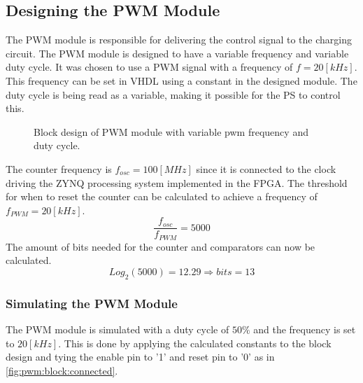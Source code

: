 \documentclass[../report.tex]{subfiles}
\begin{document}
\subsection{Designing the PWM Module} \label{sec:pwm:module}
The PWM module is responsible for delivering the control signal to the charging circuit. The PWM module is designed to have a variable frequency and variable duty cycle. It was chosen to use a PWM signal with a frequency of $ f = 20[kHz]$. This frequency can be set in VHDL using a constant in the designed module. The duty cycle is being read as a variable, making it possible for the PS to control this.

\begin{figure}[H]
    \centering
    \noindent{}
    \caption{Block design of PWM module with variable pwm frequency and duty cycle.}
    \label{fig:pwm:block}
\end{figure}

The counter frequency is $f_{osc} = 100 [MHz]$ since it is connected to the clock driving the ZYNQ processing system implemented in the FPGA. The threshold for when to reset the counter can be calculated to achieve a frequency of $f_{PWM} = 20 [kHz]$.
\begin{equation}
    \frac{f_{osc}}{f_{PWM}} = 5000
\end{equation}
The amount of bits needed for the counter and comparators can now be calculated.
\begin{equation}
    Log_2(5000) = 12.29 \Rightarrow bits = 13
\end{equation}

\subsubsection{Simulating the PWM Module}
The PWM module is simulated with a duty cycle of $50 \%$ and the frequency is set to $20 [kHz]$. This is done by applying the calculated constants to the block design and tying the enable pin to '1' and reset pin to '0' as in \autoref{fig:pwm:block:connected}.
\end{document}
